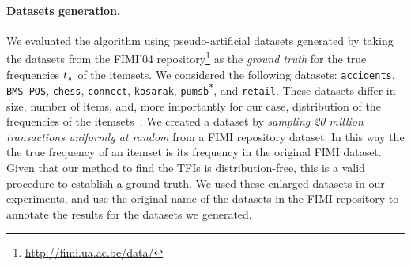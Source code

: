 \paragraph*{Datasets generation.}\label{sec:dsgen}
We evaluated the algorithm using pseudo-artificial datasets generated by taking the datasets from the FIMI'04
repository\footnote{\url{http://fimi.ua.ac.be/data/}} as the \emph{ground truth} for the true frequencies
$t_\pi$ of the itemsets. We considered the following datasets:
\texttt{accidents}, %
\texttt{BMS-POS}, \texttt{chess},
\texttt{connect}, \texttt{kosarak}, \texttt{pumsb\textsuperscript{*}}, and
\texttt{retail}. %
These datasets differ in size, number of
items, and, more importantly for our case, distribution of the frequencies of the
itemsets~\citep{GoethalsZ04}. We
created a dataset by \emph{sampling 20 million transactions uniformly at random} from a FIMI
repository dataset. In this way the 
the true frequency of an itemset is its frequency in the
original FIMI dataset. Given that our method to find the TFIs is
distribution-free, this is a valid procedure to establish a ground truth. We used
these enlarged datasets in our experiments, and use the original name of the
datasets in the FIMI repository to annotate the results for the datasets we generated.

